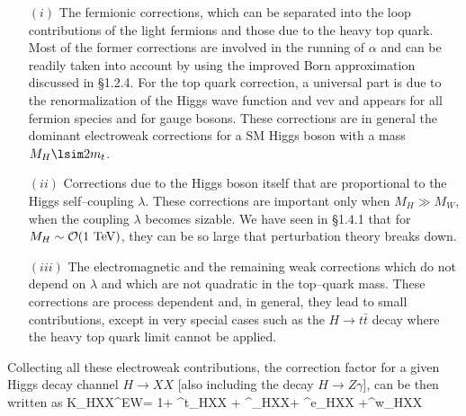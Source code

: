 \begin{itemize}

\item[$(i)$] The fermionic corrections, which can be separated into the loop
contributions of the light fermions and those due to the heavy top quark. Most
of the former corrections are involved in the running of $\alpha$ and can be 
readily taken into account by using the improved Born approximation discussed 
in \S1.2.4. For the top quark correction, a universal part is due to 
the renormalization of the Higgs wave function and vev and appears for all 
fermion species and for gauge bosons. These corrections are in general the 
dominant electroweak corrections for a SM Higgs boson with a mass $M_H \lsim 
2m_t$.%

\item[$(ii)$] Corrections due to the Higgs boson itself that are proportional
to the Higgs self--coupling $\lambda$. These corrections are important only
when $M_H \gg M_W$, when the coupling $\lambda$ becomes sizable. We have
seen in \S1.4.1 that for $M_H \sim {\cal O}(1~{\rm TeV})$, they can be so 
large that perturbation theory breaks down. 

\item[$(iii)$] The electromagnetic and the remaining weak corrections which 
do not depend on $\lambda$ and which are not quadratic in the top--quark 
mass. These corrections are process dependent and, in general, they lead to 
  small contributions, except in very special cases such as the $H \to 
t\bar{t}$ decay where the heavy top quark limit cannot be applied. 
\end{itemize}

Collecting all these electroweak  contributions, the correction factor for a
given Higgs decay channel $ H \to XX$ [also including the decay $H \to
Z\gamma$], can be then written as
\beq
K_{H\to XX}^{\rm EW}= 1+ \delta^t_{HXX} + \delta^\lambda_{HXX}+ \delta^e_{HXX}  
+\delta^w_{HXX} 
\label{ewcorfac}
\eeq

